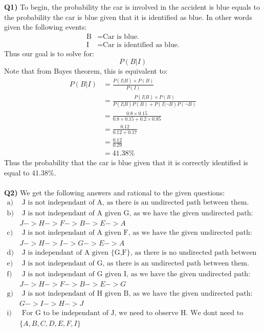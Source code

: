 \documentclass{article}
\begin{document}
\begin{titlepage}
\vspace{0.5cm}
\textbf{Q1)} To begin, the probability the car is involved in the accident is blue equals to the probability the car is blue given that it is identified as blue. In other words given the following events:
\begin{align*}
\text{B} &= \text{Car is blue.} \\
\text{I} &= \text{Car is identified as blue.}
\end{align*}
Thus our goal is to solve for:
\[ P(B|I) \]
Note that from Bayes theorem, this is equivalent to:
\begin{align*}
P(B|I) &= \frac{P(I|B)\times P(B)}{P(I)} \\
&= \frac{P(I|B)\times P(B)}{P(I|B)P(B) + P(I|\neg B)P(\neg B)} \\
&= \frac{0.8 \times 0.15}{0.8 \times 0.15 + 0.2 \times 0.85} \\
&= \frac{0.12}{0.12 + 0.17} \\
&= \frac{0.12}{0.29} \\
&= 41.38\%
\end{align*}
Thus the probability that the car is blue given that it is correctly identified is equal to 41.38$\%$.\\\\
\textbf{Q2)} We get the following answers and rational to the given questions:
\begin{align*}
\text{a)} & \text{ J is not independant of A, as there is an undirected path between them.} \\
\text{b)} & \text{ J is not independant of A given G, as we have the given undirected path:} \\
& J -> H -> F -> B -> E -> A\\
\text{c)} & \text{ J is not independant of A given F, as we have the given undirected path:} \\
& J -> H -> I -> G -> E -> A\\
\text{d)} & \text{ J is independant of A given \{G,F\}, as there is no undirected path between them.} \\
\text{e)} & \text{ J is not independant of G, as there is an undirected path between them.} \\
\text{f)} & \text{ J is not independant of G given I, as we have the given undirected path:} \\
& J -> H -> F -> B -> E -> G \\
\text{g)} & \text{ J is not independant of H given B, as we have the given undirected path:} \\
& G -> I -> H -> J\\
\text{i)} & \text{ For G to be independant of J, we need to observe H. We dont need to oberserve any of the following:} \\
& \{A,B,C,D,E,F,I\}
\end{align*}
\end{titlepage}
\end{document}

